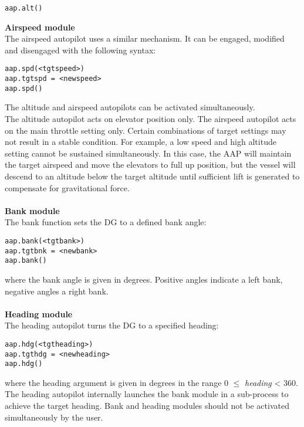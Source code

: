 \documentclass[Orbiter User Manual.tex]{subfiles}
\begin{document}
\begin{lstlisting}[language=OSFS]
aap.alt()
\end{lstlisting}

\noindent
\textbf{Airspeed module}\\
The airspeed autopilot uses a similar mechanism. It can be engaged, modified and disengaged with the following syntax:

\begin{lstlisting}[language=OSFS]
aap.spd(<tgtspeed>)
aap.tgtspd = <newspeed>
aap.spd()
\end{lstlisting}

\noindent
The altitude and airspeed autopilots can be activated simultaneously.\\
The altitude autopilot acts on elevator position only. The airspeed autopilot acts on the main throttle setting only. Certain combinations of target settings may not result in a stable condition. For example, a low speed and high altitude setting cannot be sustained simultaneously. In this case, the AAP will maintain the target airspeed and move the elevators to full up position, but the vessel will descend to an altitude below the target altitude until sufficient lift is generated to compensate for gravitational force.\\
\\
\textbf{Bank module}\\
The bank function sets the DG to a defined bank angle:

\begin{lstlisting}[language=OSFS]
aap.bank(<tgtbank>)
aap.tgtbnk = <newbank>
aap.bank()
\end{lstlisting}

\noindent
where the bank angle is given in degrees. Positive angles indicate a left bank, negative angles a right bank.\\
\\
\textbf{Heading module}\\
The heading autopilot turns the DG to a specified heading:

\begin{lstlisting}[language=OSFS]
aap.hdg(<tgtheading>)
aap.tgthdg = <newheading>
aap.hdg()
\end{lstlisting}

\noindent
where the heading argument is given in degrees in the range 0 $\leq$ \textit{heading} < 360. The heading autopilot internally launches the bank module in a sub-process to achieve the target heading. Bank and heading modules should not be activated simultaneously by the user.
\end{document}
